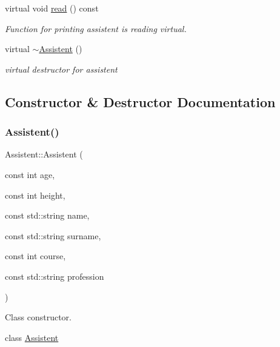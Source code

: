 \begin{DoxyCompactItemize}
virtual void \hyperlink{classAssistent_a87e86658bb7109b439d28d9694ababde}{read} () const
\begin{DoxyCompactList}\small\item\em Function for printing assistent is reading virtual. \end{DoxyCompactList}\item 
\mbox{\label{classAssistent_af2fc524ca3bdd928226ad3944d60913d}} 
virtual \hyperlink{classAssistent_af2fc524ca3bdd928226ad3944d60913d}{$\sim$\+Assistent} ()
\begin{DoxyCompactList}\small\item\em virtual destructor for assistent \end{DoxyCompactList}\end{DoxyCompactItemize}


\subsection{Constructor \& Destructor Documentation}
\mbox{\label{classAssistent_a9c294d2c2e77a296a1ee084924a20556}} 
\subsubsection{\texorpdfstring{Assistent()}{Assistent()}\hspace{0.1cm}{\footnotesize\ttfamily [1/3]}}
{\footnotesize\ttfamily Assistent\+::\+Assistent (\begin{DoxyParamCaption}\item[{const int}]{age,  }\item[{const int}]{height,  }\item[{const std\+::string}]{name,  }\item[{const std\+::string}]{surname,  }\item[{const int}]{course,  }\item[{const std\+::string}]{profession }\end{DoxyParamCaption})}



Class constructor. 

class \hyperlink{classAssistent}{Assistent}


